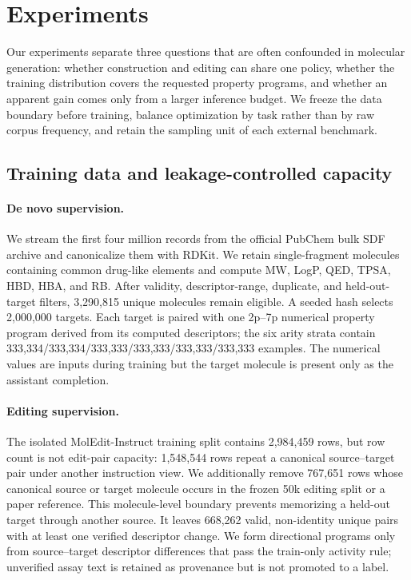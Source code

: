 \section{Experiments}
\label{sec:experiments}

Our experiments separate three questions that are often confounded in
molecular generation: whether construction and editing can share one policy,
whether the training distribution covers the requested property programs, and
whether an apparent gain comes only from a larger inference budget. We freeze
the data boundary before training, balance optimization by task rather than by
raw corpus frequency, and retain the sampling unit of each external benchmark.

\subsection{Training data and leakage-controlled capacity}
\paragraph{De novo supervision.}
We stream the first four million records from the official PubChem bulk SDF
archive and canonicalize them with RDKit. We retain single-fragment molecules
containing common drug-like elements and compute MW, LogP, QED, TPSA, HBD, HBA,
and RB. After validity, descriptor-range, duplicate, and held-out-target
filters, 3,290,815 unique molecules remain eligible. A seeded hash selects
2,000,000 targets. Each target is paired with one 2p--7p numerical property
program derived from its computed descriptors; the six arity strata contain
333,334/333,334/333,333/333,333/333,333/333,333 examples. The numerical values
are inputs during training but the target molecule is present only as the
assistant completion.

\paragraph{Editing supervision.}
The isolated MolEdit-Instruct training split contains 2,984,459 rows, but row
count is not edit-pair capacity: 1,548,544 rows repeat a canonical
source--target pair under another instruction view. We additionally remove
767,651 rows whose canonical source or target molecule occurs in the frozen
50k editing split or a paper reference. This molecule-level boundary prevents
memorizing a held-out target through another source. It leaves 668,262 valid,
non-identity unique pairs with at least one verified descriptor change. We form
directional programs only from source--target descriptor differences that pass
the train-only activity rule; unverified assay text is retained as provenance
but is not promoted to a label.


